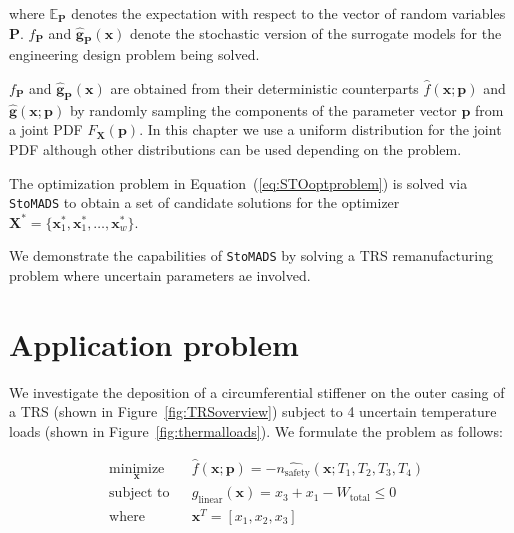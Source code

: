where $\mathbb{E}_{\mathbf{P}}$ denotes the expectation with respect to the vector of random variables $\mathbf{P}$. $f_{\mathbf{P}}$ and $\hat{\mathbf{g}}_{\mathbf{P}}(\mathbf{x})$ denote the stochastic version of the surrogate models for the engineering design problem being solved.

$f_{\mathbf{P}}$ and $\hat{\mathbf{g}}_{\mathbf{P}}(\mathbf{x})$ are obtained from their deterministic counterparts $\hat{f}(\mathbf{x};{\mathbf{p}})$ and $\hat{\mathbf{g}}(\mathbf{x};{\mathbf{p}})$ by randomly sampling the components of the parameter vector $\mathbf{p}$ from a joint \ac{PDF} $F_{\mathbf{X}}(\mathbf{p})$. In this chapter we use a uniform distribution for the joint \ac{PDF} although other distributions can be used depending on the problem.

The optimization problem in Equation~(\ref{eq:STOoptproblem}) is solved via \texttt{StoMADS} to obtain a set of candidate solutions for the optimizer $\mathbf{X}^*=  \{ \mathbf{x}^*_1,\mathbf{x}^*_1,\ldots,\mathbf{x}^*_w \} $.

We demonstrate the capabilities of \texttt{StoMADS} by solving a \ac{TRS} remanufacturing problem where uncertain parameters ae involved.

\section{Application problem} \label{sec:TSEcasestudy}

We investigate the deposition of a circumferential stiffener on the outer casing of a \ac{TRS} (shown in Figure~\ref{fig:TRSoverview}) subject to 4 uncertain temperature loads (shown in Figure~\ref{fig:thermalloads}). We formulate the problem as follows:

\begin{equation} \label{eq:Stoproblemdet}
    \begin{aligned}
        & \underset{\mathbf{x}}{\text{minimize}}
        & & \hat{f}(\mathbf{x};\mathbf{p}) = -\hat{n_{\textrm{safety}}}(\mathbf{x};T_1,T_2,T_3,T_4)\\
        & \text{subject to}
        & & {g_{\textrm{linear}}}(\mathbf{x}) = x_3 + x_1 - W_{\textrm{total}} \le 0\\
        & \text{where}
        & & \mathbf{x}^T = \left[x_1,x_2,x_3\right]\\
    \end{aligned}
\end{equation}

